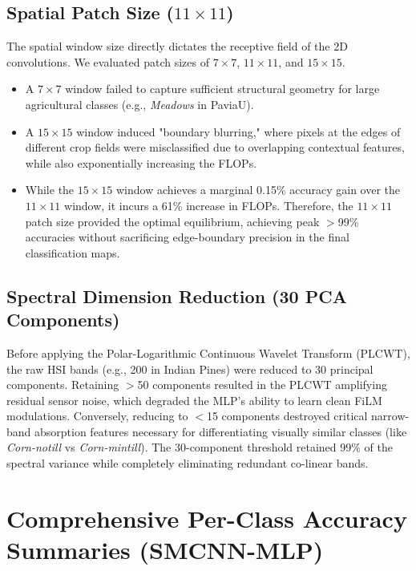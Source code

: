 \documentclass[pdflatex,sn-mathphys-num,iicol]{sn-jnl}
\begin{document}
\subsection{Spatial Patch Size ($11 \times 11$)}
The spatial window size directly dictates the receptive field of the 2D convolutions. We evaluated patch sizes of $7 \times 7$, $11 \times 11$, and $15 \times 15$. 
\begin{itemize}
    \item A $7 \times 7$ window failed to capture sufficient structural geometry for large agricultural classes (e.g., \textit{Meadows} in PaviaU). 
    \item A $15 \times 15$ window induced "boundary blurring," where pixels at the edges of different crop fields were misclassified due to overlapping contextual features, while also exponentially increasing the FLOPs. 
    \item While the $15 \times 15$ window achieves a marginal 0.15\% accuracy gain over the $11 \times 11$ window, it incurs a 61\% increase in FLOPs. Therefore, the $11 \times 11$ patch size provided the optimal equilibrium, achieving peak $>$99\% accuracies without sacrificing edge-boundary precision in the final classification maps.
\end{itemize}

\subsection{Spectral Dimension Reduction (30 PCA Components)}
Before applying the Polar-Logarithmic Continuous Wavelet Transform (PLCWT), the raw HSI bands (e.g., 200 in Indian Pines) were reduced to 30 principal components. Retaining $>$50 components resulted in the PLCWT amplifying residual sensor noise, which degraded the MLP's ability to learn clean FiLM modulations. Conversely, reducing to $<$15 components destroyed critical narrow-band absorption features necessary for differentiating visually similar classes (like \textit{Corn-notill} vs \textit{Corn-mintill}). The 30-component threshold retained 99\% of the spectral variance while completely eliminating redundant co-linear bands.


\section{Comprehensive Per-Class Accuracy Summaries (SMCNN-MLP)}\label{sec:perclass}
\end{document}

